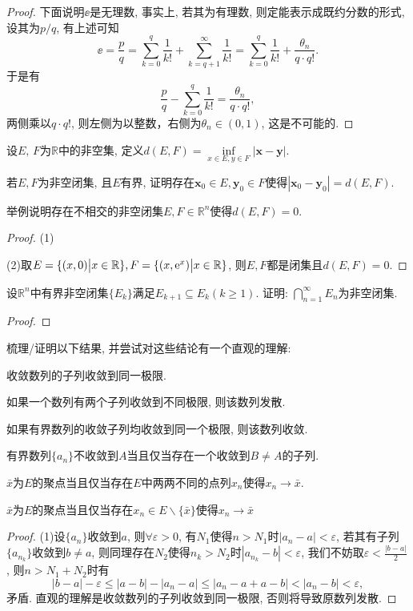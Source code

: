 \begin{quiza}
\begin{proof}
下面说明\(\ee\)是无理数, 事实上, 若其为有理数, 则定能表示成既约分数的形式, 设其为\(p/q\), 有上述可知\[\ee=\frac{p}{q}=\sum_{k=0}^{q}\frac{1}{k!}+\sum_{k=q+1}^{\infty}\frac{1}{k!}=\sum_{k=0}^{q}\frac{1}{k!}+\frac{\theta_n}{q\cdot q!}.\]于是有\[\frac{p}{q}-\sum_{k=0}^{q}\frac{1}{k!}=\frac{\theta_n}{q\cdot q!},\]两侧乘以\(q\cdot q!\), 则左侧为以整数，右侧为\(\theta_n\in(0,1)\), 这是不可能的.
\end{proof}
\woe 设\(E,\,F\)为\(\mathbb{R}\)中的非空集, 定义\(d(E,F)=\underset{x\in E,y\in F}{\inf}|\boldsymbol{x}-\boldsymbol{y}|.\)
\begin{quizs}
      \item 若\(E,F\)为非空闭集, 且\(E\)有界, 证明存在\(\boldsymbol{x}_0\in E,\boldsymbol{y}_0\in F\)使得\(|\boldsymbol{x}_0-\boldsymbol{y}_0|=d(E,F)\).
      \item 举例说明存在不相交的非空闭集\(E,F\in \mathbb{R}^n\)使得\(d(E,F)=0\).
\end{quizs}
\begin{proof}
(1)

(2)取\(E=\{(x,0)\big| x\in\mathbb{R}\},F=\{(x,\mathrm{e}^x)\big|x\in\mathbb{R}\}\), 则\(E,F\)都是闭集且\(d(E,F)=0\).
\end{proof}
\woe 设\(\mathbb{R}^n\)中有界非空闭集\(\{E_k\}\)满足\(E_{k+1}\subseteq E_{k}(k\geqslant 1)\). 证明: \(\bigcap_{n=1}^\infty E_n\)为非空闭集.
\begin{proof}

\end{proof}
\woestar 梳理/证明以下结果, 并尝试对这些结论有一个直观的理解:
\begin{quizcs}
\item 收敛数列的子列收敛到同一极限.
\item 如果一个数列有两个子列收敛到不同极限, 则该数列发散.
\item 如果有界数列的收敛子列均收敛到同一个极限, 则该数列收敛.
\item 有界数列\(\{a_n\}\)不收敛到\(A\)当且仅当存在一个收敛到\(B\ne A\)的子列.
\item \(\bar{x}\)为\(E\)的聚点当且仅当存在\(E\)中两两不同的点列\(x_n\)使得\(x_n\rightarrow \bar{x}\).
\item \(\bar{x}\)为\(E\)的聚点当且仅当存在\(x_n\in E\backslash\{\bar{x}\}\)使得\(x_n\rightarrow \bar{x}\)
\end{quizcs}
\begin{proof}
	(1)设\(\{a_n\}\)收敛到\(a\), 则\(\forall\varepsilon>0\), 有\(N_1\)使得\(n>N_1\)时\(|a_n-a|<\varepsilon\),	若其有子列\(\{a_{n_k}\}\)收敛到\(b\ne a\), 则同理存在\(N_2\)使得\(n_k>N_2\)时\(|a_{n_k}-b|<\varepsilon\), 我们不妨取\(\varepsilon<\frac{|b-a|}{2}\), 则\(n>N_1+N_2\)时有\[|b-a|-\varepsilon\leqslant|a-b|-|a_n-a|\leqslant|a_n-a+a-b|<|a_n-b|<\varepsilon,\]矛盾. 直观的理解是收敛数列的子列收敛到同一极限, 否则将导致原数列发散.
	

\end{proof}
\end{quiza}
